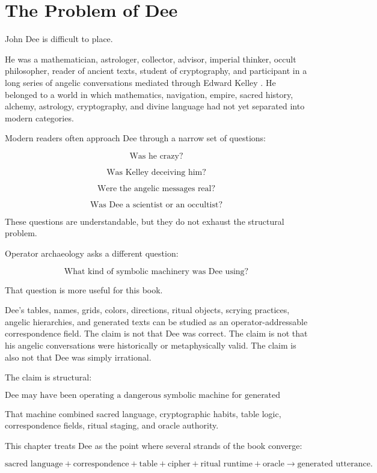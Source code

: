 \documentclass[11pt]{book}
\begin{document}
\section{The Problem of Dee}

John Dee is difficult to place.

He was a mathematician, astrologer, collector, advisor, imperial thinker, occult philosopher, reader of ancient texts, student of cryptography, and participant in a long series of angelic conversations mediated through Edward Kelley \cite{DeeCasaubon1659TrueFaithfulRelation,Yates1964GiordanoBruno}. He belonged to a world in which mathematics, navigation, empire, sacred history, alchemy, astrology, cryptography, and divine language had not yet separated into modern categories.

Modern readers often approach Dee through a narrow set of questions:

\[
\text{Was he crazy?}
\]

\[
\text{Was Kelley deceiving him?}
\]

\[
\text{Were the angelic messages real?}
\]

\[
\text{Was Dee a scientist or an occultist?}
\]

These questions are understandable, but they do not exhaust the structural problem.

Operator archaeology asks a different question:

\[
\text{What kind of symbolic machinery was Dee using?}
\]

That question is more useful for this book.

Dee's tables, names, grids, colors, directions, ritual objects, scrying practices, angelic hierarchies, and generated texts can be studied as an operator-addressable correspondence field. The claim is not that Dee was correct. The claim is not that his angelic conversations were historically or metaphysically valid. The claim is also not that Dee was simply irrational.

The claim is structural:

\[
\text{Dee may have been operating a dangerous symbolic machine for generated insight.}
\]

That machine combined sacred language, cryptographic habits, table logic, correspondence fields, ritual staging, and oracle authority.

This chapter treats Dee as the point where several strands of the book converge:

\[
\text{sacred language}
+
\text{correspondence}
+
\text{table}
+
\text{cipher}
+
\text{ritual runtime}
+
\text{oracle}
\rightarrow
\text{generated utterance}.
\]
\end{document}

